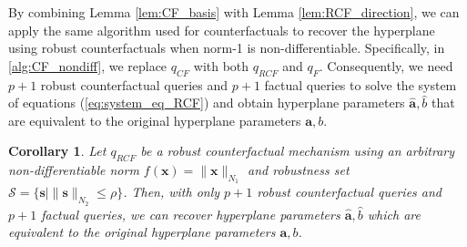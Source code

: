\documentclass{article}
\newtheorem{corollary}[theorem]{Corollary}
\begin{document}
By combining Lemma \ref{lem:CF_basis} with Lemma \ref{lem:RCF_direction}, we can apply the same algorithm used for counterfactuals to recover the hyperplane using robust counterfactuals when norm-1 is non-differentiable. Specifically, in \cref{alg:CF_nondiff}, we replace $q_{CF}$ with both $q_{RCF}$ and $q_F$. Consequently, we need $p+1$ robust counterfactual queries and $p+1$ factual queries to solve the system of equations (\ref{eq:system_eq_RCF}) and obtain hyperplane parameters $\hat{\bm{a}},\hat{b}$ that are equivalent to the original hyperplane parameters $\bm{a},b$.

\begin{corollary}\label{crl:non_diff_RCF_main}
   Let $q_{RCF}$ be a robust counterfactual mechanism using an arbitrary non-differentiable norm $f(\bm{x}) = \|\bm{x}\|_{N_1}$ and robustness set $\mathcal{S} = \{\bm{s} \mid \|\bm{s}\|_{N_2}\leq\rho\}$. Then, with only $p+1$ robust counterfactual queries and $p+1$ factual queries, we can recover hyperplane parameters $\hat{\bm{a}}, \hat{b}$ which are equivalent to the original hyperplane parameters $\bm{a}, b$.
\end{corollary}
\end{document}
